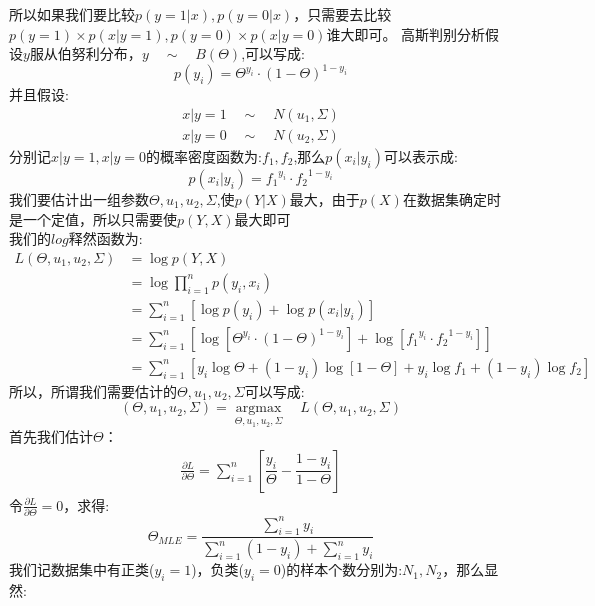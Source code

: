 \documentclass[withoutpreface,bwprint]{cumcmthesis} %
\begin{document}
	所以如果我们要比较$p(y=1|x),p(y=0|x)$，只需要去比较$p(y=1) \times p(x|y=1),p(y=0) \times p(x|y=0)$谁大即可。
	高斯判别分析假设$y$服从伯努利分布，$y \quad \sim \quad B(\Theta)$,可以写成:
	\begin{equation*}
		p(y_i)={\Theta}^{y_i} \cdot{\left(1-\Theta\right)}^{1-y_i}
	\end{equation*}
	并且假设:
	\begin{align*}
		x|y=1 \quad \sim \quad N(u_1,\Sigma)\\
		x|y=0 \quad \sim \quad N(u_2,\Sigma)
	\end{align*}
	分别记$x|y=1,x|y=0$的概率密度函数为:$f_1,f_2$,那么$p(x_i|y_i)$可以表示成:
	\begin{equation}
		p(x_i|y_i)={f_1}^{y_i}\cdot {f_2}^{1-y_i}
	\end{equation}
	我们要估计出一组参数$\Theta,u_1,u_2,\Sigma$,使$p(Y|X)$最大，由于$p(X)$在数据集确定时是一个定值，所以只需要使$p(Y,X)$最大即可\\
	我们的$log$释然函数为:
	\begin{align*}
		L(\Theta,u_1,u_2,\Sigma)	&=\log p(Y,X)\\
			&=\log \prod \limits_{i=1}^n p(y_i,x_i)\\
			&= \sum_{i=1}^{n} \left[ \log p(y_i) + \log p(x_i|y_i) \right]\\
			&= \sum_{i=1}^{n} \left[ \log \left[{\Theta}^{y_i} \cdot{\left(1-\Theta\right)}^{1-y_i} \right] + \log \left[{f_1}^{y_i}\cdot {f_2}^{1-y_i}\right] \right]\\
			&= \sum_{i=1}^{n} \left[ 
				y_i \log \Theta +(1-y_i) \log \left[ 1-\Theta\right] +y_i \log f_1 +(1-y_i)\log f_2
			\right]
	\end{align*}
	所以，所谓我们需要估计的$\Theta,u_1,u_2,\Sigma$可以写成:
	\begin{equation}
		\left(\Theta,u_1,u_2,\Sigma \right)={\mathop{argmax}\limits_{\Theta,u_1,u_2,\Sigma}} \quad L(\Theta,u_1,u_2,\Sigma)
	\end{equation}
	首先我们估计$\Theta$：
	\begin{align*}
		\frac{\partial L}{\partial \Theta}=\sum_{i=1}^{n}\left[ \dfrac{y_i}{\Theta}-\dfrac{1-y_i}{1-\Theta} \right]
	\end{align*}
	令$\frac{\partial L}{\partial \Theta}=0$，求得:
	\begin{equation}
		\Theta_{MLE}=\dfrac{\sum_{i=1}^{n}y_i}{\sum_{i=1}^{n}(1-y_i)+\sum_{i=1}^{n}y_i}
	\end{equation}
	我们记数据集中有正类($y_i=1$)，负类($y_i=0$)的样本个数分别为:$N_1,N_2$，那么显然:
\end{document}

